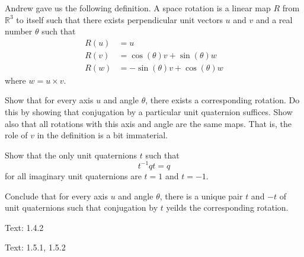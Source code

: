 \documentclass[minion]{homework}
\newcommand{\Reals}{\mathbb{R}}
\begin{document}
\begin{problems}
\problem Andrew gave us the following definition.  A
space rotation is a linear map $R$ from $\Reals^3$ to itself
such that there exists perpendicular unit vectors $u$ and
$v$ and a real number $\theta$ such that
\begin{equation}
\begin{aligned}
R(u) &= u\\
R(v) &= \cos(\theta) v + \sin(\theta) w\\
R(w) &= -\sin(\theta) v + \cos(\theta) w
\end{aligned}
\end{equation}
where $w = u\times v$.
\begin{subproblems}
\item Show that for every axis $u$ and angle $\theta$,
there exists a corresponding rotation. Do this by
showing that conjugation by a particular unit quaternion 
suffices.  Show also that all
rotations with this axis and angle are the same maps.
That is, the role of $v$ in the definition is a bit immaterial.

\item Show that the only unit quaternions $t$ such that
\[
t^{-1} q t = q
\]
for all imaginary unit quaternions are $t=1$ and $t=-1$.
\item Conclude that for every axis $u$ and angle $\theta$,
there is a unique pair $t$ and $-t$ of unit quaternions
such that conjugation by $t$ yeilds the corresponding rotation.
\end{subproblems}

\problem Text: 1.4.2

\problem Text: 1.5.1, 1.5.2


\end{problems}
\end{document}

